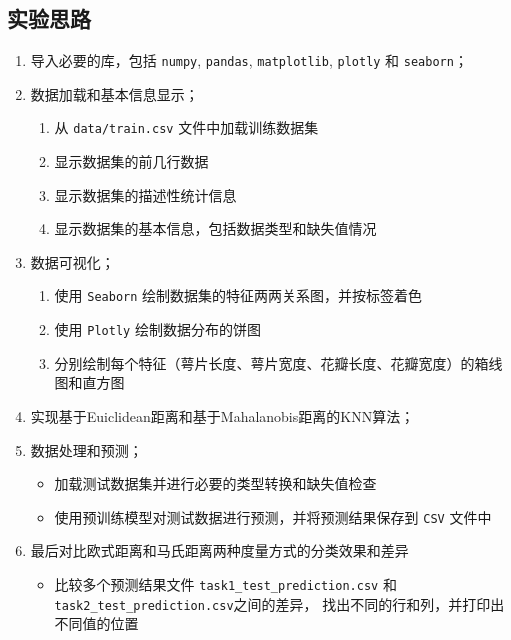 \documentclass[12pt]{article}
\begin{document}
\subsection{实验思路}
\begin{enumerate}
  \item 导入必要的库，包括 \texttt{numpy}, \texttt{pandas}, \texttt{matplotlib}, \texttt{plotly} 和 \texttt{seaborn}；
  \item 数据加载和基本信息显示；
        \begin{enumerate}
          \item 从 \texttt{data/train.csv} 文件中加载训练数据集
          \item 显示数据集的前几行数据
          \item 显示数据集的描述性统计信息
          \item 显示数据集的基本信息，包括数据类型和缺失值情况
        \end{enumerate}
  \item 数据可视化；
        \begin{enumerate}
          \item 使用 \texttt{Seaborn} 绘制数据集的特征两两关系图，并按标签着色
          \item 使用 \texttt{Plotly} 绘制数据分布的饼图
          \item 分别绘制每个特征（萼片长度、萼片宽度、花瓣长度、花瓣宽度）的箱线图和直方图
        \end{enumerate}
  \item 实现基于Euiclidean距离和基于Mahalanobis距离的KNN算法；

  \item 数据处理和预测；
        \begin{itemize}
          \item 加载测试数据集并进行必要的类型转换和缺失值检查
          \item 使用预训练模型对测试数据进行预测，并将预测结果保存到 \texttt{CSV} 文件中
        \end{itemize}
  \item 最后对比欧式距离和马氏距离两种度量方式的分类效果和差异
        \begin{itemize}
          \item 比较多个预测结果文件 \texttt{task1\_test\_prediction.csv} 和\\ \texttt{task2\_test\_prediction.csv}之间的差异，
                找出不同的行和列，并打印出不同值的位置
        \end{itemize}
\end{enumerate}
\end{document}
